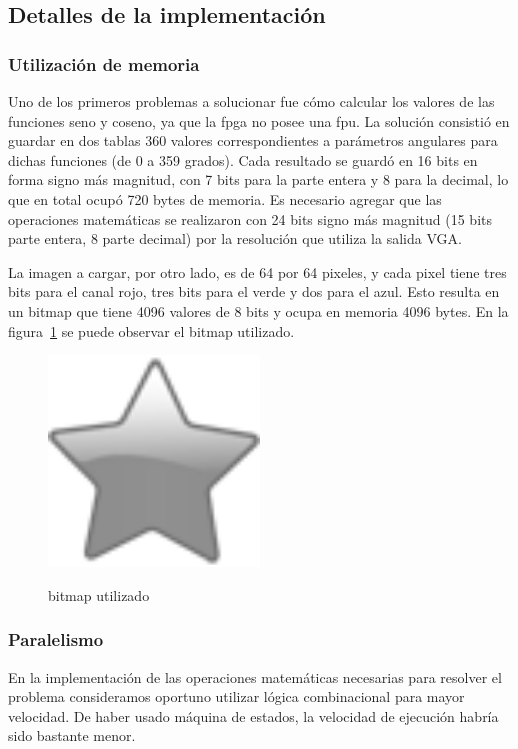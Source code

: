 \subsection{Detalles de la implementación}
\subsubsection{Utilización de memoria}
Uno de los primeros problemas a solucionar fue cómo calcular los valores de las funciones seno y coseno, ya que la fpga no posee una fpu. La solución consistió en guardar en dos tablas $360$ valores correspondientes a parámetros angulares para dichas funciones (de 0 a 359 grados). Cada resultado se guardó en 16 bits en forma signo más magnitud, con 7 bits para la parte entera y 8 para la decimal, lo que en total ocupó 720 bytes de memoria. Es necesario agregar que las operaciones matemáticas se realizaron con 24 bits signo más magnitud (15 bits parte entera, 8 parte decimal) por la resolución que utiliza la salida VGA.
\par La imagen a cargar, por otro lado, es de 64 por 64 pixeles, y cada pixel tiene tres bits para el canal rojo, tres bits para el verde y dos para el azul. Esto resulta en un bitmap que tiene 4096 valores de 8 bits y ocupa en memoria 4096 bytes. En la figura~\ref{fig:chess} se puede observar el bitmap utilizado. 

\begin{figure}[h!]
 \caption{bitmap utilizado}
 \centering
   \includegraphics[width=0.5\textwidth]{bitmap.png}
   \label{fig:chess}
\end{figure}   

\subsubsection{Paralelismo}
En la implementación de las operaciones matemáticas necesarias para resolver el problema consideramos oportuno utilizar lógica combinacional para mayor velocidad. De haber usado máquina de estados, la velocidad de ejecución habría sido bastante menor.

